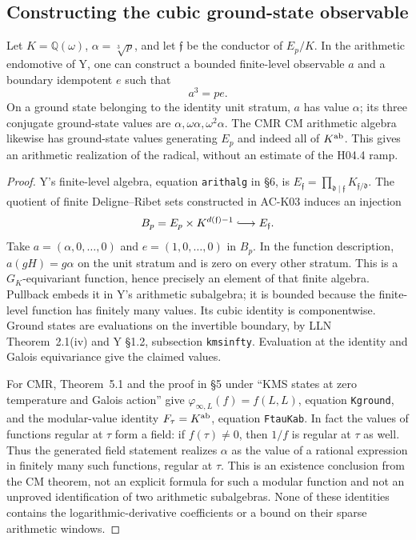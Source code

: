 \subsection{Constructing the cubic ground-state observable}

\begin{proposition}
\label{AC-B03}
Let $K=\mathbb Q(\omega)$, $\alpha=\sqrt[3]p$, and let
$\mathfrak f$ be the conductor of $E_p/K$. In the arithmetic
endomotive of Y, one can construct a bounded finite-level
observable $a$ and a boundary idempotent $e$ such that
\[
                         a^3=p e.
\]
On a ground state belonging to the identity unit stratum,
$a$ has value $\alpha$; its three conjugate ground-state values
are $\alpha,\omega\alpha,\omega^2\alpha$.
The CMR CM arithmetic algebra likewise has ground-state values
generating $E_p$ and indeed all of $K^{\rm ab}$. This gives an
arithmetic realization of the radical, without an estimate of
the H04.4 ramp.
\end{proposition}
\begin{proof}
Y's finite-level algebra, equation \texttt{arithalg} in \S6,
is $E_{\mathfrak f}=\prod_{\mathfrak d\mid\mathfrak f}
K_{\mathfrak f/\mathfrak d}$. The quotient of finite
Deligne--Ribet sets constructed in AC-K03 induces an injection
\[
 B_p=E_p\times K^{d(\mathfrak f)-1}\lhook\joinrel\longrightarrow
 E_{\mathfrak f}.
\]
Take $a=(\alpha,0,\ldots,0)$ and $e=(1,0,\ldots,0)$ in $B_p$.
In the function description, $a(gH)=g\alpha$ on the unit
stratum and is zero on every other stratum. This is a
$G_K$-equivariant function, hence precisely an element of that
finite algebra. Pullback embeds it in Y's arithmetic subalgebra;
it is bounded because the finite-level function has finitely
many values. Its cubic identity is componentwise. Ground states
are evaluations on the invertible boundary, by LLN Theorem~2.1(iv)
and Y \S1.2, subsection \texttt{kmsinfty}. Evaluation at the
identity and Galois equivariance give the claimed values.

For CMR, Theorem~5.1 and the proof in \S5 under
``KMS states at zero temperature and Galois action'' give
$\varphi_{\infty,L}(f)=f(L,L)$, equation \texttt{Kground},
and the modular-value identity $F_\tau=K^{\rm ab}$,
equation \texttt{FtauKab}. In fact the values of functions
regular at $\tau$ form a field: if $f(\tau)\ne0$, then
$1/f$ is regular at $\tau$ as well. Thus the generated field
statement realizes $\alpha$ as the value of a rational
expression in finitely many such functions, regular at
$\tau$. This is an existence conclusion from the CM theorem,
not an explicit formula for such a modular function and not
an unproved identification of two arithmetic subalgebras.
None of these identities contains the logarithmic-derivative
coefficients or a bound on their sparse arithmetic windows.
\end{proof}

